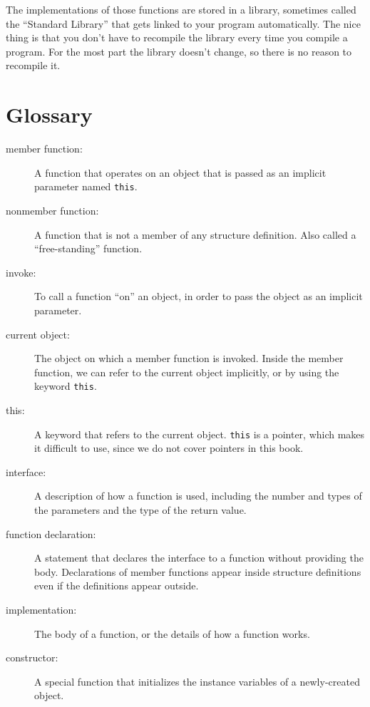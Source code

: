 The implementations of those functions are stored in a library,
sometimes called the ``Standard Library'' that gets linked to
your program automatically.  The nice thing is that you don't
have to recompile the library every time you compile a program.
For the most part the library doesn't change, so there is no
reason to recompile it.

\section{Glossary}

\begin{description}

\item[member function:]  A function that operates on an object
that is passed as an implicit parameter named {\tt this}.

\item[nonmember function:]  A function that is not a member
of any structure definition.  Also called a ``free-standing''
function.

\item[invoke:] To call a function ``on'' an object, in order to
pass the object as an implicit parameter.

\item[current object:]  The object on which a member function
is invoked.  Inside the member function, we can refer to the
current object implicitly, or by using the keyword {\tt this}.

\item[this:]  A keyword that refers to the current object.
{\tt this} is a pointer, which makes it difficult to use, since
we do not cover pointers in this book.

\item[interface:] A description of how a function is used, including
the number and types of the parameters and the type of the return
value.

\item[function declaration:] A statement that declares the interface
to a function without providing the body.  Declarations of
member functions appear inside structure definitions even if the
definitions appear outside.

\item[implementation:] The body of a function, or the details of how
a function works.

\item[constructor:] A special function that initializes the instance
variables of a newly-created object.


\end{description}

